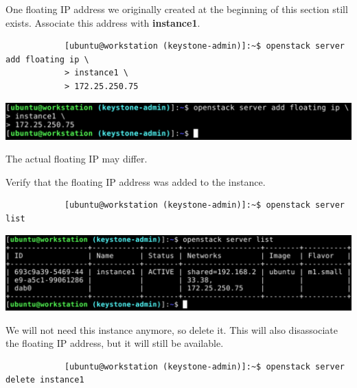 \documentclass[letterpaper, 12pt]{article}
\begin{document}
\begin{enumerate}
    \begin{labstep}
        One floating IP address we originally created at the beginning of this section still exists.
        Associate this address with \textbf{instance1}.
        \begin{lstlisting}
            [ubuntu@workstation (keystone-admin)]:~$ openstack server add floating ip \
            > instance1 \
            > 172.25.250.75
        \end{lstlisting}

        \begin{center}
            \includegraphics[width=\linewidth]{images/part3/step23.png}
        \end{center}
    \end{labstep}

    \begin{notebox}
        The actual floating IP may differ.
    \end{notebox}

    \begin{labstep}
        Verify that the floating IP address was added to the instance.
        \begin{lstlisting}
            [ubuntu@workstation (keystone-admin)]:~$ openstack server list
        \end{lstlisting}

        \begin{center}
            \includegraphics[width=\linewidth]{images/part3/step24.png}
        \end{center}
    \end{labstep}

    \begin{labstep}
        We will not need this instance anymore, so delete it.
        This will also disassociate the floating IP address, but it will still be available.
        \begin{lstlisting}
            [ubuntu@workstation (keystone-admin)]:~$ openstack server delete instance1
        \end{lstlisting}


\end{labstep}
\end{enumerate}
\end{document}
